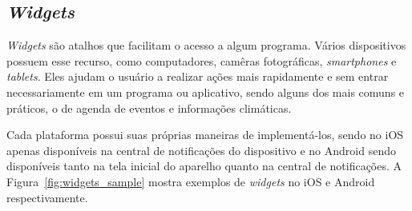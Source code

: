 \begin{comment}
\subsection{Acessibilidade} \label{subsec:acessibilidade}
Não se pode deixar de lado uma grande parcela da população que possui algum tipo de deficiência na hora de planejar novos sistemas e 
aplicativos. Cada plataforma possui seus próprios recursos para auxiliar pessoas com 
deficiência a utilizar os \textit{smartphones} e também possuem \textit{SDKs} que os desenvolvedores podem utilizar para deixar os 
aplicativos usáveis para todos. No iOS existem muitos recursos disponíveis como VoiceOver, 
Ditado e a própria Siri\footnote{\url{http://www.apple.com/br/accessibility/ios}}. No Android exite o TalkBack, BrailleBack e Acesso 
por voz\footnote{\url{https://support.google.com/accessibility/android}}. 

Importante ressaltar que os aplicativos aliados às tecnologias presentes nos \textit{smartphones} podem ajudar pessoas com deficiência 
a serem incluídas socialmente, a viverem melhor e até mesmo ajudar na reabilitação 
já que alguns aplicativos são usados para fisioterapia e aprendizado diferenciado como no caso de pessoas com autismo ou daltonismo.

https://github.com/phonegap/phonegap-mobile-accessibility
https://github.com/driftyco/ionic/issues/4100

\end{comment} 
 
\subsection{\textit{Widgets}} \label{subsec:widgets}
\textit{Widgets} são atalhos que facilitam o acesso a algum programa. Vários dispositivos possuem esse recurso, como computadores, camêras fotográficas, \textit{smartphones} e \textit{tablets}. Eles ajudam o usuário a 
realizar ações mais rapidamente e sem entrar necessariamente em um programa ou aplicativo, sendo alguns dos mais comuns e práticos, o de agenda de eventos e informações climáticas.

Cada plataforma possui suas próprias maneiras de implementá-los, sendo no iOS apenas disponíveis na central de notificações do dispositivo e no Android sendo disponíveis tanto na tela inicial do aparelho quanto na central 
de notificações. A Figura~\ref{fig:widgets_sample} mostra exemplos de \textit{widgets} no iOS e Android respectivamente.

